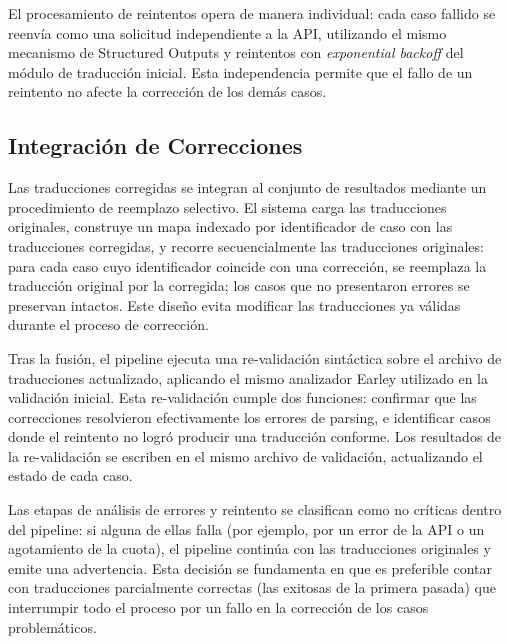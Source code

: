 El procesamiento de reintentos opera de manera individual: cada caso fallido se reenvía como una solicitud independiente a la API, utilizando el mismo mecanismo de Structured Outputs y reintentos con \textit{exponential backoff} del módulo de traducción inicial. Esta independencia permite que el fallo de un reintento no afecte la corrección de los demás casos.

\subsection{Integración de Correcciones}

Las traducciones corregidas se integran al conjunto de resultados mediante un procedimiento de reemplazo selectivo. El sistema carga las traducciones originales, construye un mapa indexado por identificador de caso con las traducciones corregidas, y recorre secuencialmente las traducciones originales: para cada caso cuyo identificador coincide con una corrección, se reemplaza la traducción original por la corregida; los casos que no presentaron errores se preservan intactos. Este diseño evita modificar las traducciones ya válidas durante el proceso de corrección.

Tras la fusión, el pipeline ejecuta una re-validación sintáctica sobre el archivo de traducciones actualizado, aplicando el mismo analizador Earley utilizado en la validación inicial. Esta re-validación cumple dos funciones: confirmar que las correcciones resolvieron efectivamente los errores de parsing, e identificar casos donde el reintento no logró producir una traducción conforme. Los resultados de la re-validación se escriben en el mismo archivo de validación, actualizando el estado de cada caso.

Las etapas de análisis de errores y reintento se clasifican como no críticas dentro del pipeline: si alguna de ellas falla (por ejemplo, por un error de la API o un agotamiento de la cuota), el pipeline continúa con las traducciones originales y emite una advertencia. Esta decisión se fundamenta en que es preferible contar con traducciones parcialmente correctas (las exitosas de la primera pasada) que interrumpir todo el proceso por un fallo en la corrección de los casos problemáticos.

